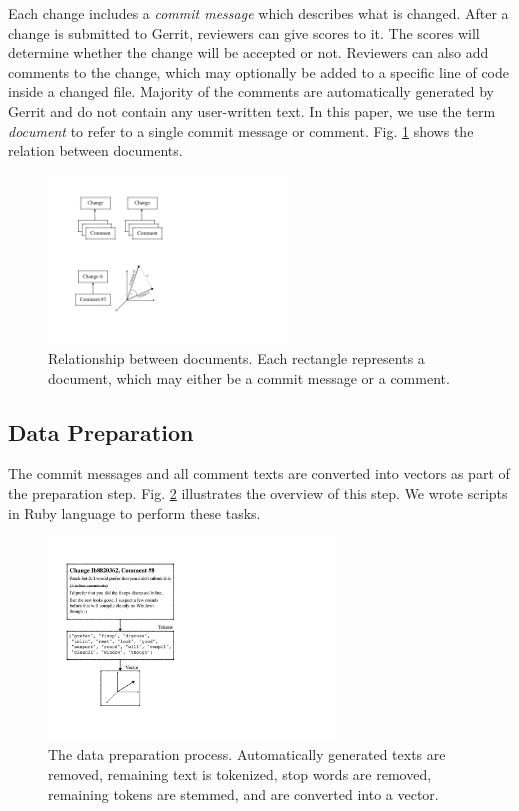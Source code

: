 \documentclass[conference]{IEEEtran}
\begin{document}
Each change includes a \emph{commit message} which describes what is changed.
After a change is submitted to Gerrit, reviewers can give scores to it.
The scores will determine whether the change will be accepted or not.
Reviewers can also add comments to the change, which may optionally be added to a specific line of code inside a changed file.
Majority of the comments are automatically generated by Gerrit and do not contain any user-written text.
In this paper, we use the term \emph{document} to refer to a single commit message or comment.
Fig. \ref{fig:hierarchy} shows the relation between documents.

\begin{figure}[h]
\centering
\includegraphics[width=2.5in]{hierarchy}
\caption{Relationship between documents.
Each rectangle represents a document, which may either be a commit message or a comment.}
\label{fig:hierarchy}
\end{figure}

\subsection{Data Preparation}

The commit messages and all comment texts are converted into vectors as part of the preparation step.
Fig. \ref{fig:preprocess} illustrates the overview of this step.
We wrote scripts in Ruby language to perform these tasks.

\begin{figure}[h]
\centering
\includegraphics[width=3in]{preprocess}
\caption{The data preparation process.
Automatically generated texts are removed, remaining text is tokenized, stop words are removed, remaining tokens are stemmed,
and are converted into a vector.}
\label{fig:preprocess}
\end{figure}
\end{document}
